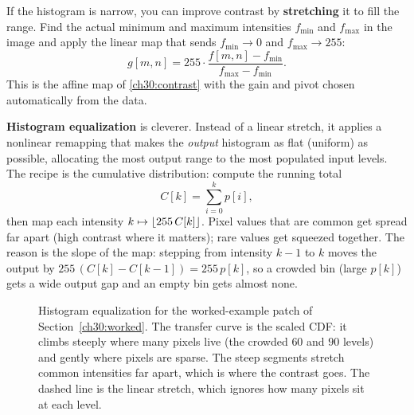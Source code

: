 If the histogram is narrow, you can improve contrast by \textbf{stretching} it to
fill the range. Find the actual minimum and maximum intensities $f_{\min}$ and
$f_{\max}$ in the image and apply the linear map that sends $f_{\min}\to 0$ and
$f_{\max}\to 255$:
\begin{equation}
\label{ch30:stretch}
g[m,n] = 255\cdot \frac{f[m,n]-f_{\min}}{f_{\max}-f_{\min}}.
\end{equation}
This is the affine map of \eqref{ch30:contrast} with the gain and pivot
chosen automatically from the data.

\textbf{Histogram equalization} is cleverer. Instead of a linear stretch, it
applies a nonlinear remapping that makes the \emph{output} histogram as flat
(uniform) as possible, allocating the most output range to the most populated
input levels. The recipe is the cumulative distribution: compute the running
total
\begin{equation}
\label{ch30:cdf}
C[k] = \sum_{i=0}^{k} p[i],
\end{equation}
then map each intensity $k\mapsto \lfloor255\,C[k]\rfloor$. Pixel values that are common
get spread far apart (high contrast where it matters); rare values get squeezed
together. The reason is the slope of the map: stepping from intensity $k-1$ to $k$
moves the output by $255\,(C[k]-C[k-1]) = 255\,p[k]$, so a crowded bin (large
$p[k]$) gets a wide output gap and an empty bin gets almost none.

\begin{figure}[H]
\centering
{}
\caption{Histogram equalization for the worked-example patch of
Section~\ref{ch30:worked}. The transfer curve is the scaled CDF: it climbs
steeply where many pixels live (the crowded $60$ and $90$ levels) and gently where
pixels are sparse. The steep segments stretch common intensities far apart, which
is where the contrast goes. The dashed line is the linear stretch, which ignores
how many pixels sit at each level.}
\label{ch30:fig-cdf}
\end{figure}

